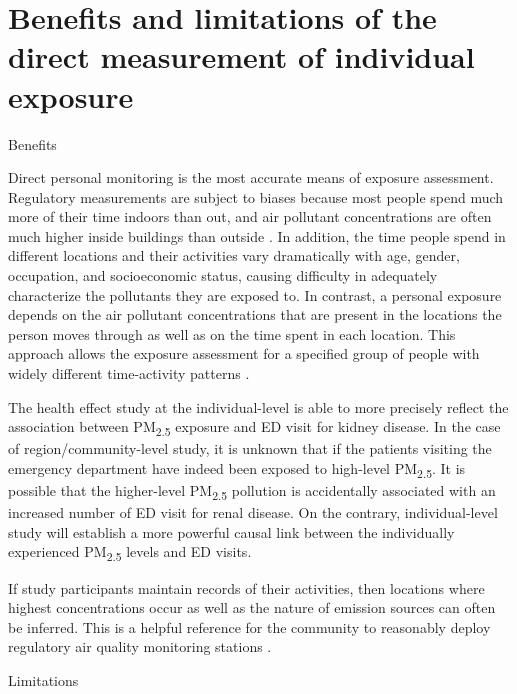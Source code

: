 \documentclass[11pt]{article}
\newcommand{\tsub}{\textsubscript}
\begin{document}
\section{Benefits and limitations of the direct measurement of individual exposure}
\begin{itemize*}
    \item Benefits {
        \begin{enumerate*}[{[(1)]}]
            \item Direct personal monitoring is the most accurate means of exposure assessment. Regulatory measurements are subject to biases because most people spend much more of their time indoors than out, and air pollutant concentrations are often much higher inside buildings than outside \citep{spengler1983indoor}. In addition, the time people spend in different locations and their activities vary dramatically with age, gender, occupation, and socioeconomic status, causing difficulty in adequately characterize the pollutants they are exposed to. In contrast, a personal exposure depends on the air pollutant concentrations that are present in the locations the person moves through as well as on the time spent in each location. This approach allows the exposure assessment for a specified group of people with widely different time-activity patterns \citep{watson1988air}. 
            \item The health effect study at the individual-level is able to more precisely reflect the association between PM\tsub{2.5} exposure and ED visit for kidney disease. In the case of region/community-level study, it is unknown that if the patients visiting the emergency department have indeed been exposed to high-level PM\tsub{2.5}. It is possible that the higher-level PM\tsub{2.5} pollution is accidentally associated with an increased number of ED visit for renal disease. On the contrary, individual-level study will establish a more powerful causal link between the individually experienced PM\tsub{2.5} levels and ED visits.
            \item If study participants maintain records of their activities, then locations where highest concentrations occur as well as the nature of emission sources can often be inferred. This is a helpful reference for the community to reasonably deploy regulatory air quality monitoring stations \citep{watson1988air}.  
        \end{enumerate*}
    }
    \item Limitations {
        \begin{enumerate*}[{[(1)]}]

\end{enumerate*}}
\end{itemize*}
\end{document}
